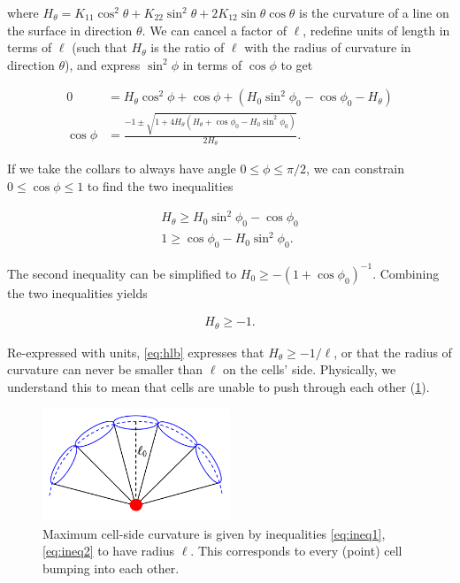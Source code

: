 \noindent where $H_\theta = K_{11}\cos^2\theta + K_{22}\sin^2\theta + 2K_{12}\sin\theta\cos\theta$ is the curvature of a line on the surface in direction $\theta$. 
We can cancel a factor of $\ell$, redefine units of length in terms of $\ell$ (such that $H_\theta$ is the ratio of $\ell$ with the radius of curvature in direction $\theta$), and express $\sin^2\phi$ in terms of $\cos\phi$ to get

\begin{align*}
    0 &= H_\theta \cos^2\phi + \cos\phi + (H_0\sin^2\phi_0 - \cos\phi_0 - H_\theta) \\
    \cos\phi &= \frac{-1 \pm \sqrt{1 + 4H_\theta (H_\theta + \cos\phi_0 - H_0\sin^2\phi_0)}}{2H_\theta}.
\end{align*}

If we take the collars to always have angle $0 \leq \phi \leq \pi/2$, we can constrain $0 \leq \cos\phi \leq 1$ to find the two inequalities 

\begin{align}
    H_\theta \geq H_0 \sin^2\phi_0 - \cos\phi_0 \label{eq:ineq1}\\
    1 \geq \cos\phi_0 - H_0 \sin^2\phi_0. \label{eq:ineq2}
\end{align}

\noindent The second inequality can be simplified to $H_0 \geq -(1+\cos\phi_0)^{-1}$. 
Combining the two inequalities yields 

\begin{align}
    H_\theta \geq -1. \label{eq:hlb}
\end{align}

\noindent Re-expressed with units, \cref{eq:hlb} expresses that $H_\theta \geq -1/\ell$, or that the radius of curvature can never be smaller than $\ell$ on the cells' side. 
Physically, we understand this to mean that cells are unable to push through each other (\cref{fig:maxcurv}).

\begin{figure}[hbtp]
    \centering
    \includegraphics[width=0.5\textwidth]{arc.png}
    \caption[Bounded sheet curvature permitted in the continuous sheet description]{Maximum cell-side curvature is given by inequalities \ref{eq:ineq1}, \ref{eq:ineq2} to have radius $\ell$. This corresponds to every (point) cell bumping into each other.}
    \label{fig:maxcurv}
\end{figure}

